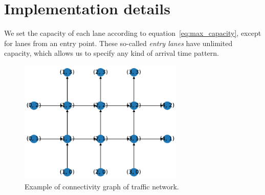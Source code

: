 \documentclass{article}
\theoremstyle{definition}
\theoremstyle{plain}
\begin{document}

\newpage
\section*{Implementation details}

We set the capacity of each lane according to equation~\eqref{eq:max_capacity},
except for lanes from an entry point. These so-called \textit{entry lanes} have
unlimited capacity, which allows us to specify any kind of arrival time pattern.

\begin{figure}
  \centering
  \includegraphics[width=0.7\textwidth]{figures/network_graph_example.pdf}
  \caption{Example of connectivity graph of traffic network.}
\end{figure}




\end{document}
